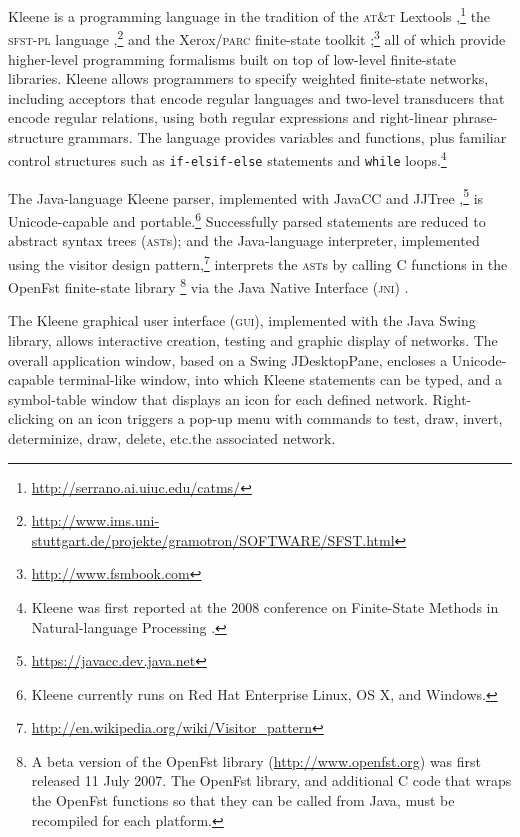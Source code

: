 \documentclass[letterpaper,12pt]{article}
\newcommand{\Kleene}{Kleene\xspace}
\newcommand{\acro}{\textsc}
\def\CPP{{C\nolinebreak[4]\hspace{-.08em}\raisebox{.3ex}{\footnotesize\bf
+}\nolinebreak\hspace{-.1em}\raisebox{.3ex}{\footnotesize\bf +}}}
\begin{document}
\Kleene{} is a programming language in the
tradition of the \acro{at\&t}
Lextools \cite{roark+sproat:2007},\footnote{\url{http://serrano.ai.uiuc.edu/catms/}}
the \acro{sfst-pl} language \cite{schmid:2005},\footnote{\url{http://www.ims.uni-stuttgart.de/projekte/gramotron/SOFTWARE/SFST.html}} and the
Xerox/\acro{parc} finite-state
toolkit \cite{beesley+karttunen:2003};\footnote{\url{http://www.fsmbook.com}} 
all of which provide
higher-level programming formalisms built on top of low-level finite-state
libraries.  \Kleene{} allows programmers to specify weighted
finite-state networks, including acceptors that encode regular
languages and two-level transducers that encode regular relations,
using both regular expressions and right-linear phrase-structure
grammars. The language provides variables and functions, plus
familiar control structures such as \verb!if-elsif-else!
statements and \verb!while!
loops.\footnote{Kleene was first reported at the 2008 conference on
Finite-State Methods in Natural-language Processing \cite{beesley:2009}.}

The Java-language \Kleene{} parser, implemented with JavaCC and
JJTree \cite{copeland:2007},\footnote{\url{https://javacc.dev.java.net}} 
is Unicode-capable and portable.\footnote{Kleene currently runs on Red
Hat Enterprise Linux, OS X, and Windows.}
Successfully parsed statements are reduced to abstract
syntax trees (\acro{ast}s); and the Java-language interpreter,
implemented using the visitor design
pattern,\footnote{\url{http://en.wikipedia.org/wiki/Visitor_pattern}} 
interprets the \acro{ast}s by calling \CPP{} functions in the
OpenFst finite-state 
library
\cite{allauzen+riley+schalkwyk+skut+mohri:2007}\footnote{A beta version of the 
OpenFst library (\url{http://www.openfst.org})
was first released 11 July 2007.  The OpenFst
library, and additional \CPP{} code that wraps the OpenFst functions so that they can
be called from Java, must be recompiled for each platform.} 
via the Java Native Interface
(\acro{jni}) \cite{gordon:1998,liang:1999}.  

The \Kleene{} graphical user interface (\acro{gui}), implemented with 
the Java Swing library, 
allows interactive creation, testing and graphic display
of networks.  The overall application window, based on a Swing JDesktopPane,
encloses a Unicode-capable terminal-like window, into which Kleene statements
can be typed,
and a symbol-table window that displays an icon for each defined
network.  Right-clicking on an icon triggers a pop-up menu with
commands to test, draw, invert, determinize, draw, delete, 
etc.\@ the associated network.
\end{document}
